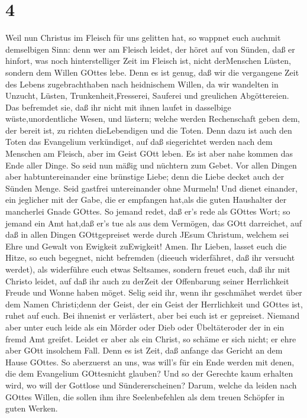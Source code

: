 \hypertarget{section-3}{%
\section{4}\label{section-3}}

 Weil nun Christus im Fleisch für uns gelitten hat, so
wappnet euch auchmit demselbigen Sinn: denn wer am Fleisch leidet, der
höret auf von Sünden,  daß er hinfort, was noch
hinterstelliger Zeit im Fleisch ist, nicht derMenschen Lüsten, sondern
dem Willen GOttes lebe.  Denn es ist genug, daß wir die
vergangene Zeit des Lebens zugebrachthaben nach heidnischem Willen, da
wir wandelten in Unzucht, Lüsten, Trunkenheit,Fresserei, Sauferei und
greulichen Abgöttereien.  Das befremdet sie, daß ihr nicht
mit ihnen laufet in dasselbige wüste,unordentliche Wesen, und lästern;
 welche werden Rechenschaft geben dem, der bereit ist, zu
richten dieLebendigen und die Toten.  Denn dazu ist auch den
Toten das Evangelium verkündiget, auf daß siegerichtet werden nach dem
Menschen am Fleisch, aber im Geist GOtt leben.  Es ist aber
nahe kommen das Ende aller Dinge.  So seid nun mäßig und
nüchtern zum Gebet. Vor allen Dingen aber habtuntereinander eine
brünstige Liebe; denn die Liebe decket auch der Sünden Menge.
 Seid gastfrei untereinander ohne Murmeln!  Und
dienet einander, ein jeglicher mit der Gabe, die er empfangen hat,als
die guten Haushalter der mancherlei Gnade GOttes.  So
jemand redet, daß er's rede als GOttes Wort; so jemand ein Amt hat,daß
er's tue als aus dem Vermögen, das GOtt darreichet, auf daß in allen
Dingen GOttgepreiset werde durch JEsum Christum, welchem sei Ehre und
Gewalt von Ewigkeit zuEwigkeit! Amen.  Ihr Lieben, lasset
euch die Hitze, so euch begegnet, nicht befremden (dieeuch widerfähret,
daß ihr versucht werdet), als widerführe euch etwas Seltsames,
 sondern freuet euch, daß ihr mit Christo leidet, auf daß
ihr auch zu derZeit der Offenbarung seiner Herrlichkeit Freude und Wonne
haben möget.  Selig seid ihr, wenn ihr geschmähet werdet
über dem Namen Christi;denn der Geist, der ein Geist der Herrlichkeit
und GOttes ist, ruhet auf euch. Bei ihnenist er verlästert, aber bei
euch ist er gepreiset.  Niemand aber unter euch leide als
ein Mörder oder Dieb oder Übeltäteroder der in ein fremd Amt greifet.
 Leidet er aber als ein Christ, so schäme er sich nicht; er
ehre aber GOtt insolchem Fall.  Denn es ist Zeit, daß
anfange das Gericht an dem Hause GOttes. So aberzuerst an uns, was
will's für ein Ende werden mit denen, die dem Evangelium GOttesnicht
glauben?  Und so der Gerechte kaum erhalten wird, wo will
der Gottlose und Sündererscheinen?  Darum, welche da leiden
nach GOttes Willen, die sollen ihm ihre Seelenbefehlen als dem treuen
Schöpfer in guten Werken.

